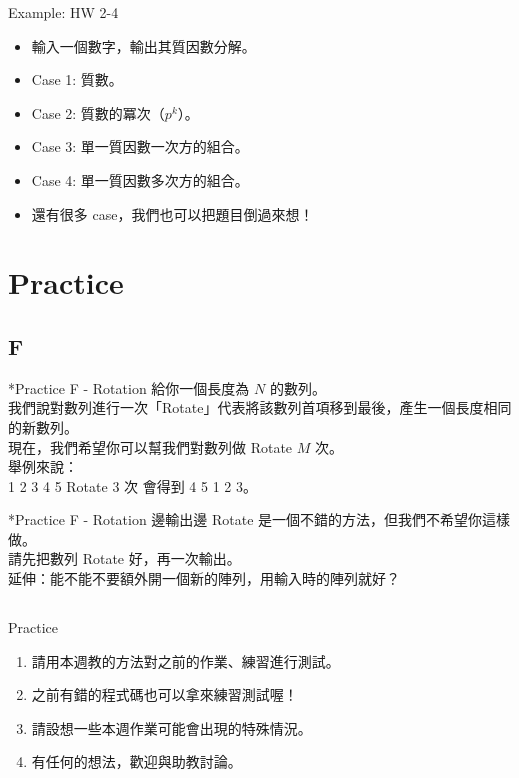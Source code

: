 \documentclass[t]{beamer}
\begin{document}
\begin{frame}{Example: HW 2-4}
  \begin{itemize}
    \item 輸入一個數字，輸出其質因數分解。
    \item Case 1: 質數。
    \item Case 2: 質數的冪次（$p^k$）。
    \item Case 3: 單一質因數一次方的組合。
    \item Case 4: 單一質因數多次方的組合。
    \item 還有很多 case，我們也可以把題目倒過來想！
  \end{itemize}
\end{frame}

\section{Practice}
\subsection{F}
\begin{frame}{*Practice F - Rotation}
  給你一個長度為 $N$ 的數列。\\
  我們說對數列進行一次「Rotate」代表將該數列首項移到最後，產生一個長度相同的新數列。\\
  現在，我們希望你可以幫我們對數列做 Rotate $M$ 次。\\
  \vspace{2em}
  舉例來說：\\
  1 2 3 4 5 Rotate 3 次 會得到 4 5 1 2 3。
\end{frame}

\begin{frame}{*Practice F - Rotation}
  邊輸出邊 Rotate 是一個不錯的方法，但我們不希望你這樣做。\\
  請先把數列 Rotate 好，再一次輸出。\\
  \vspace{2em}
  延伸：能不能不要額外開一個新的陣列，用輸入時的陣列就好？
\end{frame}

\subsection{}
\begin{frame}{Practice}
  \begin{enumerate}
    \item 請用本週教的方法對之前的作業、練習進行測試。
    \item 之前有錯的程式碼也可以拿來練習測試喔！
    \item 請設想一些本週作業可能會出現的特殊情況。
    \item 有任何的想法，歡迎與助教討論。
  \end{enumerate}
\end{frame}

\end{document}
